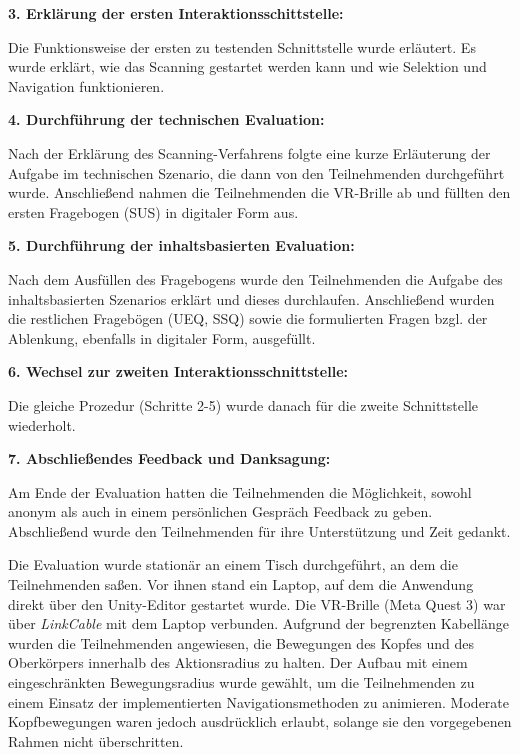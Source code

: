 {\normalfont \bfseries 3. Erklärung der ersten Interaktionsschittstelle:}

Die Funktionsweise der ersten zu testenden Schnittstelle wurde erläutert. Es wurde erklärt, wie das Scanning gestartet werden kann und wie Selektion und Navigation funktionieren. 

{\normalfont \bfseries 4. Durchführung der technischen Evaluation:}

Nach der Erklärung des Scanning-Verfahrens folgte eine kurze Erläuterung der Aufgabe im technischen Szenario, die dann von den Teilnehmenden durchgeführt wurde. Anschließend nahmen die Teilnehmenden die VR-Brille ab und füllten den ersten Fragebogen (SUS) in digitaler Form aus. 

{\normalfont \bfseries 5. Durchführung der inhaltsbasierten Evaluation:}

Nach dem Ausfüllen des Fragebogens wurde den Teilnehmenden die Aufgabe des inhaltsbasierten Szenarios erklärt und dieses durchlaufen. Anschließend wurden die restlichen Fragebögen (UEQ, SSQ) sowie die formulierten Fragen bzgl. der Ablenkung, ebenfalls in digitaler Form, ausgefüllt.

{\normalfont \bfseries 6. Wechsel zur zweiten Interaktionsschnittstelle:}

Die gleiche Prozedur (Schritte 2-5) wurde danach für die zweite Schnittstelle wiederholt.

{\normalfont \bfseries 7. Abschließendes Feedback und Danksagung:}

Am Ende der Evaluation hatten die Teilnehmenden die Möglichkeit, sowohl anonym als auch in einem persönlichen Gespräch Feedback zu geben. Abschließend wurde den Teilnehmenden für ihre Unterstützung und Zeit gedankt. 

Die Evaluation wurde stationär an einem Tisch durchgeführt, an dem die Teilnehmenden saßen. Vor ihnen stand ein Laptop, auf dem die Anwendung direkt über den Unity-Editor gestartet wurde. Die VR-Brille (Meta Quest 3) war über \textit{LinkCable} mit dem Laptop verbunden. Aufgrund der begrenzten Kabellänge wurden die Teilnehmenden angewiesen, die Bewegungen des Kopfes und des Oberkörpers innerhalb des Aktionsradius zu halten. Der Aufbau mit einem eingeschränkten Bewegungsradius wurde gewählt, um die Teilnehmenden zu einem Einsatz der implementierten Navigationsmethoden zu animieren. Moderate Kopfbewegungen waren jedoch ausdrücklich erlaubt, solange sie den vorgegebenen Rahmen nicht überschritten.

